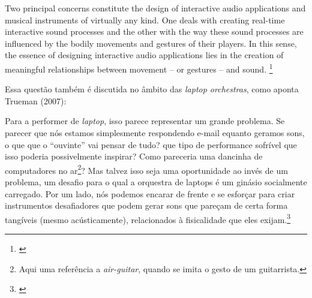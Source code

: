 \begin{citacao}
Two principal concerns constitute the design of interactive audio applications and musical instruments of virtually any kind. One deals with creating real-time interactive sound processes and the other with the way these sound processes are influenced by the bodily movements and gestures of their players. In this sense, the essence of designing interactive audio applications lies in the creation of meaningful relationships between movement – or gestures – and sound. \footnote{\cite{Schnell2013}}
\end{citacao}
Essa questão também é discutida no âmbito das \emph{laptop orchestras}, como aponta Trueman (2007):
\begin{citacao}
Para a performer de \emph{laptop}, isso parece representar um grande problema. Se parecer que nós estamos simplesmente respondendo e-mail equanto geramos sons, o que que o ``ouvinte'' vai pensar de tudo? que tipo de performance sofrível que isso poderia possivelmente inspirar? Como pareceria uma dancinha de computadores no ar\footnote{Aqui uma referência a \emph{air-guitar}, quando se imita o gesto de um guitarrista.}?
Mas talvez isso seja uma oportunidade ao invés de um problema, um desafio para o qual a orquestra de laptops é um ginásio socialmente carregado. Por um lado, nós podemos encarar de frente e se esforçar para criar instrumentos desafiadores que podem gerar sons que pareçam de certa forma tangíveis (mesmo acústicamente), relacionados à fisicalidade que eles exijam.\footnote{\cite[p. 6]{Trueman2007}} 
\end{citacao}


